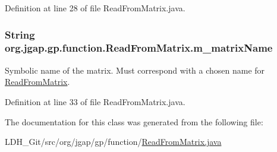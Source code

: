 Definition at line 28 of file Read\-From\-Matrix.\-java.

\hypertarget{classorg_1_1jgap_1_1gp_1_1function_1_1_read_from_matrix_abacaacfd019adde69b64400ca3d35e39}{
\subsubsection[{m\-\_\-matrix\-Name}]{\setlength{\rightskip}{0pt plus 5cm}String org.\-jgap.\-gp.\-function.\-Read\-From\-Matrix.\-m\-\_\-matrix\-Name\hspace{0.3cm}{\ttfamily [private]}}}\label{classorg_1_1jgap_1_1gp_1_1function_1_1_read_from_matrix_abacaacfd019adde69b64400ca3d35e39}
Symbolic name of the matrix. Must correspond with a chosen name for \hyperlink{classorg_1_1jgap_1_1gp_1_1function_1_1_read_from_matrix}{Read\-From\-Matrix}. 

Definition at line 33 of file Read\-From\-Matrix.\-java.



The documentation for this class was generated from the following file\-:\begin{DoxyCompactItemize}
\item 
L\-D\-H\-\_\-\-Git/src/org/jgap/gp/function/\hyperlink{_read_from_matrix_8java}{Read\-From\-Matrix.\-java}\end{DoxyCompactItemize}
